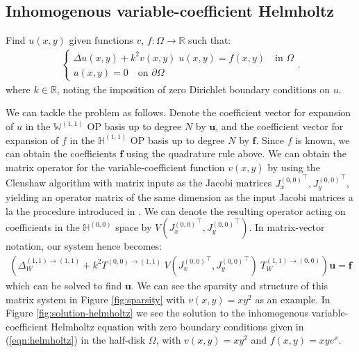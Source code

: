 \documentclass[11pt, oneside]{article}   	%
\newcommand{\R}{\mathbb{R}}
\newcommand{\hdop}{H}
\newcommand{\bighdopii}{{\mathbb{\hdop}^{(1,1)}}}
\newcommand{\bighdopoo}{{\mathbb{\hdop}^{(0,0)}}}
\newcommand{\laplacewii}{\Delta_W^{(1,1)\to(1,1)}}
\newcommand{\bigWii}{{\mathbb{W}^{(1,1)}}}
\begin{document}
\subsection{Inhomogenous variable-coefficient Helmholtz}

Find \(u(x,y)\) given functions $v$, $f : \Omega \to \R$ such that:
\begin{align}
	\begin{cases}
    		\Delta u(x,y) + k^2 v(x,y) \; u(x,y) = f(x,y) \quad \text{in } \Omega \\
		u(x,y) = 0 \quad \text{on } \partial \Omega
	\end{cases}.
	\label{eqn:helmholtz}
\end{align}
where $k \in \R$, noting the imposition of zero Dirichlet boundary conditions on $u$.

We can tackle the problem as follows. Denote the coefficient vector for expansion of $u$ in the $\bigWii$ OP basis up to degree $N$ by $\mathbf{u}$, and the coefficient vector for expansion of $f$ in the $\bighdopii$ OP basis up to degree $N$ by $\mathbf{f}$. Since $f$ is known, we can obtain  the coefficients $\mathbf{f}$ using the quadrature rule above. We can obtain the matrix operator for the variable-coefficient function $v(x,y)$ by using the Clenshaw algorithm with matrix inputs as the Jacobi matrices ${J_x^{(0,0)}}^\top, {J_y^{(0,0)}}^\top$, yielding an operator matrix of the same dimension as the input Jacobi matrices a la the procedure introduced in \cite{olver2019triangle}. We can denote the resulting operator acting on coefficients in the $\bighdopoo$ space by $V({J_x^{(0,0)}}^\top, {J_y^{(0,0)}}^\top)$. In matrix-vector notation, our system hence becomes:
\begin{align*}
    (\laplacewii + k^2 T^{(0,0)\to(1,1)} \: V({J_x^{(0,0)}}^\top, {J_y^{(0,0)}}^\top) \: T_W^{(1,1)\to(0,0)}) \mathbf{u} = \mathbf{f}
\end{align*}
which can be solved to find $\mathbf{u}$. We can see the sparsity and structure of this matrix system in Figure \ref{fig:sparsity} with $v(x,y) = xy^2$ as an example. In Figure \ref{fig:solution-helmholtz} we see the solution to the inhomogenous variable-coefficient Helmholtz equation with zero boundary conditions given in (\ref{eqn:helmholtz}) in the half-disk $\Omega$, with  $v(x,y) = xy^2$ and $f(x,y) = xy e^x$.
\end{document}
